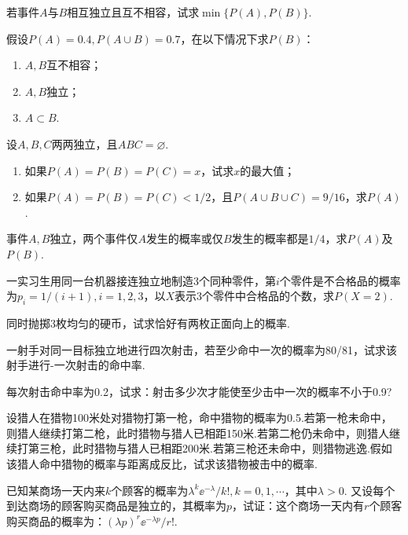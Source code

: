 \begin{xiti}
  \item 若事件$A$与$B$相互独立且互不相容，试求$\min\{P(A),P(B)\}$.

  \item 假设$P(A)=0.4,P(A\cup B)=0.7$，在以下情况下求$P(B)$：
      \begin{enumerate}
        \item $A,B$互不相容；
        \item $A,B$独立；
        \item $A\subset B$.
      \end{enumerate}

  \item 设$A,B,C$两两独立，且$ABC=\varnothing$.
      \begin{enumerate}
        \item 如果$P(A)=P(B)=P(C)=x$，试求$x$的最大值；
        \item 如果$P(A)=P(B)=P(C)<1/2$，且$P(A\cup B\cup C)=9/16$，求$P(A)$.
      \end{enumerate}

  \item 事件$A,B$独立，两个事件仅$A$发生的概率或仅$B$发生的概率都是$1/4$，求$P(A)$及$P(B)$.

  \item 一实习生用同一台机器接连独立地制造3个同种零件，第$i$个零件是不合格品的概率为$p_i=1/(i+1),i=1,2,3$，以$X$表示3个零件中合格品的个数，求$P(X=2)$.

  \item 同时抛掷3枚均匀的硬币，试求恰好有两枚正面向上的概率.

  \item 一射手对同一目标独立地进行四次射击，若至少命中一次的概率为80/81，试求该射手进行-一次射击的命中率.

  \item 每次射击命中率为0.2，试求：射击多少次才能使至少击中一次的概率不小于0.9?

  \item 设猎人在猎物100米处对猎物打第一枪，命中猎物的概率为0.5.若第一枪未命中，则猎人继续打第二枪，此时猎物与猎人已相距150米.若第二枪仍未命中，则猎人继续打第三枪，此时猎物与猎人已相距200米.若第三枪还未命中，则猎物逃逸.假如该猎人命中猎物的概率与距离成反比，试求该猎物被击中的概率.

  \item 已知某商场一天内来$k$个顾客的概率为$\lambda^k\ee^{-\lambda}/k!,k=0,1,\cdots$，其中$\lambda>0$. 又设每个到达商场的顾客购买商品是独立的，其概率为$p$，试证：这个商场一天内有$r$个顾客购买商品的概率为：$(\lambda p)^r\ee^{-\lambda p}/r!$.


\end{xiti}
